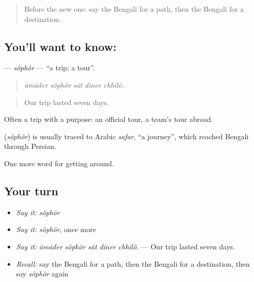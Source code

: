\label{lesson:BN-C387-sophor}



\begin{quote}
Before the new one: say the Bengali for a path, then the Bengali for a destination.
\end{quote}

\subsection*{You'll want to know: }
\textbf{} — \emph{sôphôr} — \textquotedblleft{}a trip; a tour\textquotedblright{}.

\begin{quote}
    
\end{quote}

\begin{quote}
\emph{āmāder sôphôr sāt diner chhilô.}
\end{quote}

\begin{quote}
Our trip lasted seven days.
\end{quote}

Often a trip with a purpose: an official tour, a team's tour abroad.

\begin{cousinweb}
\textbf{} (\emph{sôphôr}) is usually traced to Arabic \emph{safar}, \textquotedblleft{}a journey\textquotedblright{}, which reached Bengali through Persian.
\end{cousinweb}

\begin{grammarlens}[title={What you've built}]
One more word for getting around.
\end{grammarlens}

\subsection*{Your turn}
\begin{itemize}
\raggedright
  \item \emph{Say it:} \emph{sôphôr}
  \item \emph{Say it:} \emph{sôphôr}, once more
  \item \emph{Say it:} \emph{āmāder sôphôr sāt diner chhilô.} — Our trip lasted seven days.
  \item \emph{Recall:} say the Bengali for a path, then the Bengali for a destination, then say \emph{sôphôr} again
\end{itemize}

